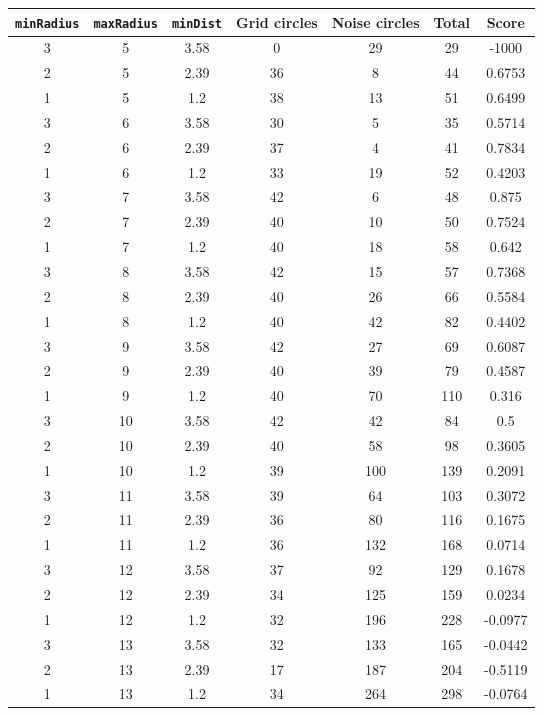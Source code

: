\documentclass[letterpaper, 12pt]{article}
\begin{document}
\begin{longtable}{|c|c|c|c|c|c|c|}
\hline
\textbf{\texttt{minRadius}} & \textbf{\texttt{maxRadius}} & \textbf{\texttt{minDist}} & \textbf{Grid circles} & \textbf{Noise circles} & \textbf{Total} & \textbf{Score} \\
\hline
3 & 5 & 3.58 & 0 & 29 & 29 & -1000 \\
\hline
2 & 5 & 2.39 & 36 & 8 & 44 & 0.6753 \\
\hline
1 & 5 & 1.2 & 38 & 13 & 51 & 0.6499 \\
\hline
3 & 6 & 3.58 & 30 & 5 & 35 & 0.5714 \\
\hline
2 & 6 & 2.39 & 37 & 4 & 41 & 0.7834 \\
\hline
1 & 6 & 1.2 & 33 & 19 & 52 & 0.4203 \\
\hline
3 & 7 & 3.58 & 42 & 6 & 48 & 0.875 \\
\hline
2 & 7 & 2.39 & 40 & 10 & 50 & 0.7524 \\
\hline
1 & 7 & 1.2 & 40 & 18 & 58 & 0.642 \\
\hline
3 & 8 & 3.58 & 42 & 15 & 57 & 0.7368 \\
\hline
2 & 8 & 2.39 & 40 & 26 & 66 & 0.5584 \\
\hline
1 & 8 & 1.2 & 40 & 42 & 82 & 0.4402 \\
\hline
3 & 9 & 3.58 & 42 & 27 & 69 & 0.6087 \\
\hline
2 & 9 & 2.39 & 40 & 39 & 79 & 0.4587 \\
\hline
1 & 9 & 1.2 & 40 & 70 & 110 & 0.316 \\
\hline
3 & 10 & 3.58 & 42 & 42 & 84 & 0.5 \\
\hline
2 & 10 & 2.39 & 40 & 58 & 98 & 0.3605 \\
\hline
1 & 10 & 1.2 & 39 & 100 & 139 & 0.2091 \\
\hline
3 & 11 & 3.58 & 39 & 64 & 103 & 0.3072 \\
\hline
2 & 11 & 2.39 & 36 & 80 & 116 & 0.1675 \\
\hline
1 & 11 & 1.2 & 36 & 132 & 168 & 0.0714 \\
\hline
3 & 12 & 3.58 & 37 & 92 & 129 & 0.1678 \\
\hline
2 & 12 & 2.39 & 34 & 125 & 159 & 0.0234 \\
\hline
1 & 12 & 1.2 & 32 & 196 & 228 & -0.0977 \\
\hline
3 & 13 & 3.58 & 32 & 133 & 165 & -0.0442 \\
\hline
2 & 13 & 2.39 & 17 & 187 & 204 & -0.5119 \\
\hline
1 & 13 & 1.2 & 34 & 264 & 298 & -0.0764 \\

\end{longtable}
\end{document}
